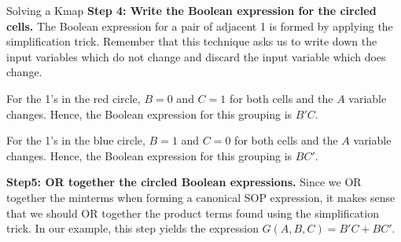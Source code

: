 \begin{process}{Solving a Kmap}
\textbf{Step 4: Write the Boolean expression for the circled cells.}
The Boolean expression for a pair of adjacent 1 is formed by applying
the simplification trick.  Remember that this
technique asks us to write down the input variables which do
not change and discard the input variable which does change.

For the 1's in the red circle, $B=0$ and $C=1$ for
both cells and the $A$ variable changes.  Hence, the
Boolean expression for this grouping is $B'C$.

For the 1's in the blue circle, $B=1$ and $C=0$ for
both cells and the $A$ variable changes.  Hence, the
Boolean expression for this grouping is $BC'$.

\textbf{Step5: OR together the circled Boolean expressions.}
Since we OR together the minterms when forming a canonical SOP
expression, it makes sense that we should OR together the product
terms found using the simplification trick.
In our example, this step yields the \SOPmin expression  $G(A,B,C) = B'C + BC'$.
\end{process}

